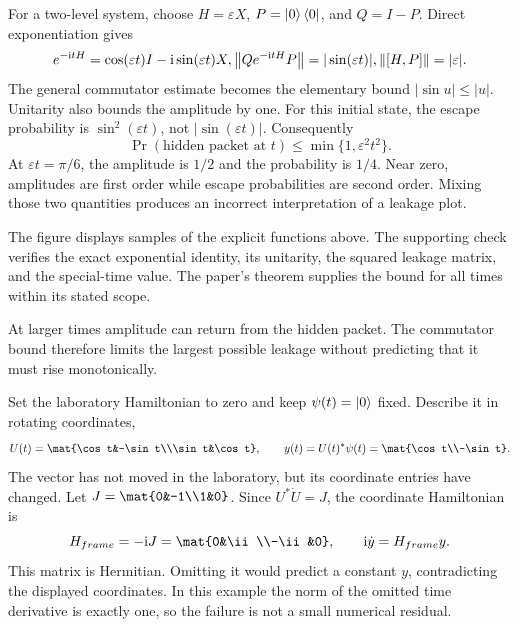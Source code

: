 For a two-level system, choose $H=\varepsilon X$, $P=\left|0\right\rangle\left\langle0\right|$, and $Q=I-P$. Direct exponentiation gives
\[
e^{-\ii tH}=\cos(\varepsilon t)I-\ii\sin(\varepsilon t)X,
\quad
\norm{Qe^{-\ii tH}P}=|\sin(\varepsilon t)|,
\quad\norm{[H,P]}=|\varepsilon|.
\]
The general commutator estimate becomes the elementary bound $|\sin u|\le |u|$. Unitarity also bounds the amplitude by one.
For this initial state, the escape probability is $\sin^2(\varepsilon t)$, not $|\sin(\varepsilon t)|$. Consequently
\[
\Pr(\text{hidden packet at }t)\le\min\{1,\varepsilon^2t^2\}.
\]
At $\varepsilon t=\pi/6$, the amplitude is $1/2$ and the probability is $1/4$. Near zero, amplitudes are first order while escape probabilities are second order. Mixing those two quantities produces an incorrect interpretation of a leakage plot.

The figure displays samples of the explicit functions above. The supporting check verifies the exact exponential identity, its unitarity, the squared leakage matrix, and the special-time value. The paper's theorem supplies the bound for all times within its stated scope.

At larger times amplitude can return from the hidden packet. The commutator bound therefore limits the largest possible leakage without predicting that it must rise monotonically.

Set the laboratory Hamiltonian to zero and keep $\psi(t)=\left|0\right\rangle$ fixed. Describe it in rotating coordinates,
\[
U(t)=\mat{\cos t&-\sin t\\\sin t&\cos t},
\qquad y(t)=U(t)^*\psi(t)=\mat{\cos t\\-\sin t}.
\]
The vector has not moved in the laboratory, but its coordinate entries have changed.
Let $J=\mat{0&-1\\1&0}$. Since $U^*\dot U=J$, the coordinate Hamiltonian is
\[
H_{\rm frame}=-\ii J=\mat{0&\ii\\-\ii&0},
\qquad \ii\dot y=H_{\rm frame}y.
\]
This matrix is Hermitian. Omitting it would predict a constant $y$, contradicting the displayed coordinates. In this example the norm of the omitted time derivative is exactly one, so the failure is not a small numerical residual.

